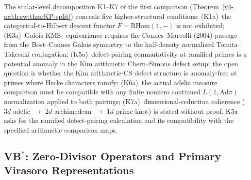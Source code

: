 The scalar-level decomposition K1--K7 of the first comparison
(Theorem~\ref{v4-arith:sw:thm:KP-split}) conceals five higher-structural
conditions:
(K1a)~the categorical-to-Hilbert descent functor
\(F=\mathrm{RHom}(\mathbb{1},-)\) is not exhibited;
(K3a)~Galois-KMS\({}_{1}\) equivariance requires the Connes--Marcolli
(2004) passage from the Bost--Connes Galois symmetry to the
half-density normalised Tomita--Takesaki conjugation;
(K5a)~defect-pairing commutativity at ramified primes is a potential
anomaly in the Kim arithmetic Chern--Simons defect setup: the open
question is whether the Kim arithmetic-CS defect structure is
anomaly-free at primes where Hecke characters ramify;
(K6a)~the actual adelic measure comparison must be compatible with
any finite nonzero continued \(L(1,\mathrm{Ad}\pi)\) normalization
applied to both pairings;
(K7a)~dimensional-reduction coherence
(\(3d\) adelic \(\to\) \(2d\) archimedean \(\to\) \(1d\) prime-knot)
is stated without proof.
K5a asks for the ramified defect-pairing calculation and its
compatibility with the specified arithmetic comparison maps.

\subsection{\texorpdfstring{VB\(^{*}\)}{VB*}: Zero-Divisor Operators and Primary Virasoro Representations}

